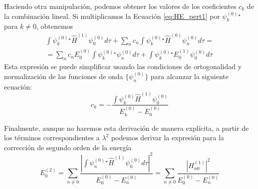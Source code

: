 Haciendo otra manipulación, podemos obtener los valores de los 
coeficientes $c_k$ de la combinación lineal. Si multiplicamos la
Ecuación \ref{eq:HE_pert1} por $\psi_k^{(0)}^\star$ para $k\neq 0$,
obtenemos
\begin{equation}
    \begin{split}
        \int \psi_k^{(0)}^\star \hat{H}^{(1)}\psi_0^{(0)}d\tau +  \sum_nc_n\int \psi_k^{(0)}^\star\hat{H}^{(0)}\psi_n^{(0)}d\tau = \\
    = \sum_nc_nE_0^{(0)}\int \psi_k^{(0)}^\star\psi_n^{(0)}d\tau + \int \psi_k^{(0)}^\star E_0^{(1)}\psi_0^{(0)}d\tau
    \end{split}
\end{equation}
Esta expresión se puede simplificar usando las condiciones de
ortogonalidad y normalización de las funciones de onda 
$\{\psi_n^{(0)}\}$ para alcanzar la siguiente ecuación:
\begin{equation}
    c_k=-\frac{\int \psi_k^{(0)}\hat{H}^{(1)}\psi_0^{(0)}}{E_k^{(0)} - E_0^{(0)}}
\end{equation}

Finalmente, aunque no haremos esta derivación de manera explícita,
a partir de los términos correspondientes a $\lambda^2$
podemos derivar la expresión para la corrección de segundo orden de
la energía
\begin{equation}
    E_0^{(2)} = \sum_{n\neq 0}\frac{|\int\psi_n^{(0)}^\star\hat{H}^{(1)}\psi_0^{(0)}d\tau|^2}{E_0^{(0)} - E_n^{(0)}} = 
    \sum_{n\neq 0}\frac{|H_{n0}^{(1)}|^2}{E_0^{(0)} - E_n^{(0)}}
\end{equation}

